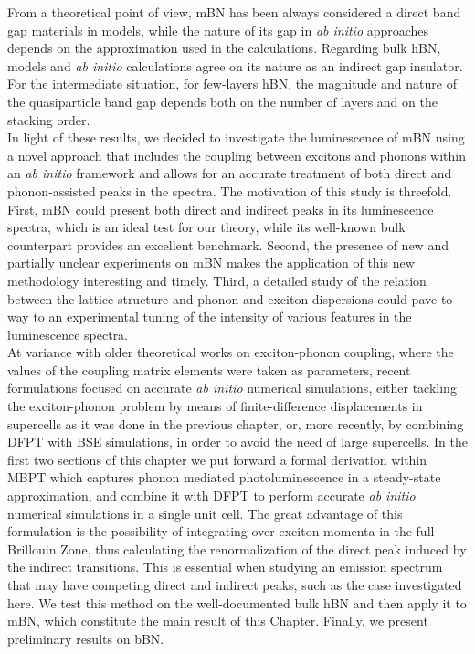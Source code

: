 From a theoretical point of view, mBN has been always considered a direct band gap materials in models,\cite{galvani2016excitons} while the nature of its gap in \emph{ab initio} approaches depends on the approximation used in the calculations.\cite{prete2020giant,mengle2019impact} Regarding bulk hBN, models and \emph{ab initio} calculations agree on its nature as an indirect gap insulator.\cite{sponza2018direct}
For the intermediate situation, for few-layers hBN, the magnitude and nature of the quasiparticle band gap depends both on the number of layers and on the stacking order.\cite{sponza2018direct,mengle2019impact,latil2022electronic}\\

In light of these results, we decided to investigate the luminescence of \acrshort{mBN} using a novel approach that includes the coupling between excitons and phonons within an \emph{ab initio} framework and allows for an accurate treatment of both direct and phonon-assisted peaks in the spectra.
The motivation of this study is threefold.
First, mBN could present both direct and indirect peaks in its luminescence spectra, which is an ideal test for our theory, while its well-known bulk counterpart provides an excellent benchmark.
Second, the presence of new and partially unclear experiments on \acrshort{mBN} makes the application of this new methodology interesting and timely.
Third, a detailed study of the relation between the lattice structure and phonon and exciton dispersions could pave to way to an experimental tuning of the intensity of various features in the luminescence spectra. \\

At variance with older theoretical works on exciton-phonon coupling, where the values of the coupling matrix elements were taken as parameters, recent formulations focused on accurate \emph{ab initio} numerical simulations, either tackling the exciton-phonon problem by means of finite-difference displacements in supercells as it was done in the previous chapter, or, more recently, by combining \acrshort{DFPT} with \acrshort{BSE} simulations, in order to avoid the need of large supercells.\cite{chen2020exciton}
In the first two sections of this chapter we put forward a formal derivation within \acrshort{MBPT} which captures phonon mediated photoluminescence in a steady-state approximation, and combine it with \acrshort{DFPT} to perform accurate \emph{ab initio} numerical simulations in a single unit cell.
The great advantage of this formulation is the possibility of integrating over exciton momenta in the full Brillouin Zone, thus calculating the renormalization of the direct peak induced by the indirect transitions. This is essential when studying an emission spectrum that may have competing direct and indirect peaks, such as the case investigated here. We test this method on the well-documented bulk \acrshort{hBN} and then apply it to \acrshort{mBN}, which constitute the main result of this Chapter. Finally, we present preliminary results on \acrshort{bBN}.

